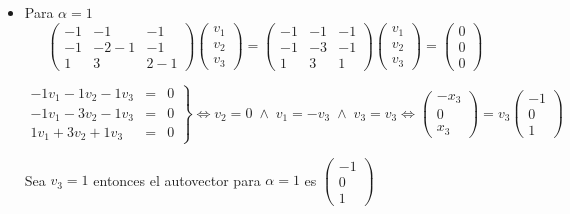 \begin{enumerate}
\begin{itemize}
	\item Para $\alpha=1$
	    $$
	    \begin{pmatrix}
		-1 & -1 & -1 \\
		-1 & -2-1 & -1 \\
		1 & 3 & 2-1
	    \end{pmatrix}  
	    \begin{pmatrix}
		v_1 \\
		v_2 \\
		v_3
	    \end{pmatrix} = 
	    \begin{pmatrix}
		-1 & -1 & -1 \\
		-1 & -3 & -1 \\
		1 & 3 & 1 
	    \end{pmatrix}  
	    \begin{pmatrix}
		v_1 \\
		v_2 \\
		v_3
	    \end{pmatrix} = 
	    \begin{pmatrix}
		0 \\
		0 \\
		0	
	    \end{pmatrix} 
	    $$

	    $$\left.\begin{array}{rcl}
		    -1 v_1 -1v_2 -1v_3&=&0\\
			    -1v_1-3v_2-1v_3&=&0\\
			    1v_1+3v_2+1v_3&=&0
		\end{array}\right\} \Longleftrightarrow v_2=0 \; \land \; v_1=-v_3 \;\land \; v_3=v_3  \Longleftrightarrow  
		\begin{pmatrix}
		    -x_3 \\
		    0 \\
		    x_3
		\end{pmatrix}=v_3
		\begin{pmatrix}
		    -1 \\
		    0 \\
		    1 
		\end{pmatrix}
		$$

		Sea $v_3=1$ entonces el autovector para $\alpha=1$ es
		$\begin{pmatrix}
		    -1 \\
		    0 \\
		    1 
		\end{pmatrix}$\\\\


\end{itemize}
\end{enumerate}
